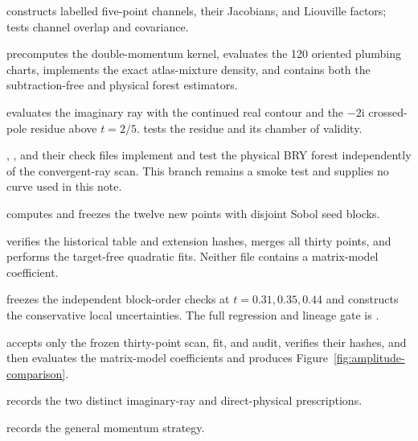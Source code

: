 \documentclass[11pt]{article}
\newcommand{\ii}{\mathrm{i}}
\begin{document}
\begin{description}[style=nextline,leftmargin=3.8cm]
  \item[Geometry and Liouville]
   constructs labelled five-point
  channels, their Jacobians, and Liouville factors;
   tests channel overlap and
  covariance.

  \item[Main kernel and atlas]
   precomputes the double-momentum
  kernel, evaluates the 120 oriented plumbing charts, implements the exact
  atlas-mixture density, and contains both the subtraction-free and physical
  forest estimators.

  \item[Contour continuation]
   evaluates the imaginary ray with
  the continued real contour and the $-2\ii$ crossed-pole residue above
  $t=2/5$.   tests the residue
  and its chamber of validity.

  \item[Physical finite part]
  ,
  , and their check files implement
  and test the physical BRY forest independently of the convergent-ray scan.
  This branch remains a smoke test and supplies no curve used in this note.

  \item[Thirty-point production and fit]
  \par
  computes and freezes the twelve new points with disjoint Sobol seed blocks.
  \par
  verifies the historical table and extension hashes, merges all thirty
  points, and performs the target-free quadratic fits.  Neither file contains
  a matrix-model coefficient.

  \item[Worldsheet audit]
   freezes the independent
  block-order checks at $t=0.31,0.35,0.44$ and constructs the conservative
  local uncertainties.  The full regression and lineage gate is
  .

  \item[Later comparison]
  \par
  accepts only the frozen thirty-point scan, fit, and audit, verifies their
  hashes, and then evaluates the matrix-model coefficients and produces
  Figure~\ref{fig:amplitude-comparison}.
  \par
  records the two distinct imaginary-ray and direct-physical prescriptions.
  \par
  records the general momentum strategy.
\end{description}
\end{document}
